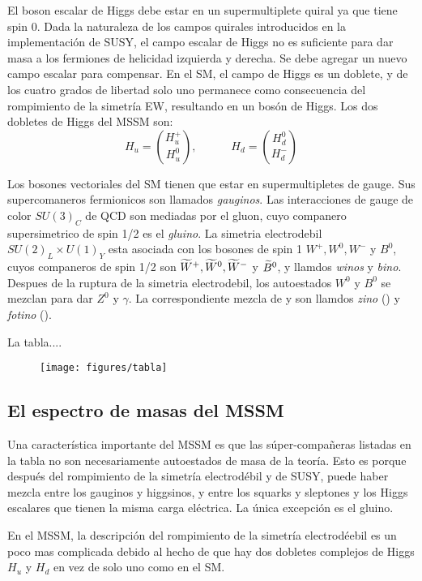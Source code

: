 El boson escalar de Higgs debe estar en un supermultiplete quiral ya que tiene spin 0.
Dada la naturaleza de los campos quirales introducidos en la implementación de SUSY, el campo
escalar de Higgs no es suficiente para dar masa a los fermiones de helicidad izquierda y derecha.
Se debe agregar un nuevo campo escalar para compensar. En el SM, el campo de Higgs es un doblete,
y de los cuatro grados de libertad solo uno permanece como consecuencia del rompimiento de la
simetría EW, resultando en un bos\'on de Higgs. Los dos dobletes de Higgs del MSSM son:
%
\begin{equation}
  H_u = \binom{H_u^+}{H_u^0}, \quad \quad \quad H_d = \binom{H_d^0}{H_d^-}
\end{equation}


Los bosones vectoriales del SM tienen que estar en supermultipletes de gauge.
Sus supercomaneros fermionicos son llamados \emph{gauginos}. Las interacciones
de gauge de color $SU(3)_C$ de QCD son mediadas por el gluon, cuyo companero
supersimetrico de spin 1/2 es el \emph{gluino}. La simetria electrodebil
$SU(2)_L \times U(1)_Y$ esta asociada con los bosones de spin 1 $W^+, W^0, W^-$
y $B^0$, cuyos companeros de spin 1/2 son $\widetilde{W}^+, \widetilde{W}^0, \widetilde{W}^-$
y $\widetilde{B}^0$, y llamdos \emph{winos} y \emph{bino}.
Despues de la ruptura de la simetria electrodebil, los autoestados $W^0$ y $B^0$
se mezclan para dar $Z^0$ y $\gamma$. La correspondiente mezcla de {\winozero}
y {\bino} son llamdos \emph{zino} (\zino) y \emph{fotino} (\photino).

La tabla....


\begin{figure}[h]
  \centering
  \texttt{[image: figures/tabla]}
\end{figure}



\subsection{El espectro de masas del MSSM}

Una característica importante del MSSM es que las súper-compañeras listadas en la
tabla no son necesariamente autoestados de masa de la teoría. Esto es porque después
del rompimiento de la simetría electrodébil y de SUSY, puede haber mezcla entre
los gauginos y higgsinos, y entre los squarks y sleptones y los Higgs escalares
que tienen la misma carga eléctrica. La única excepción es el gluino.

En el MSSM, la descripción del rompimiento de la simetría electrodéebil es un
poco mas complicada debido al hecho de que hay dos dobletes complejos de Higgs
$H_u$ y $H_d$ en vez de solo uno como en el SM.


